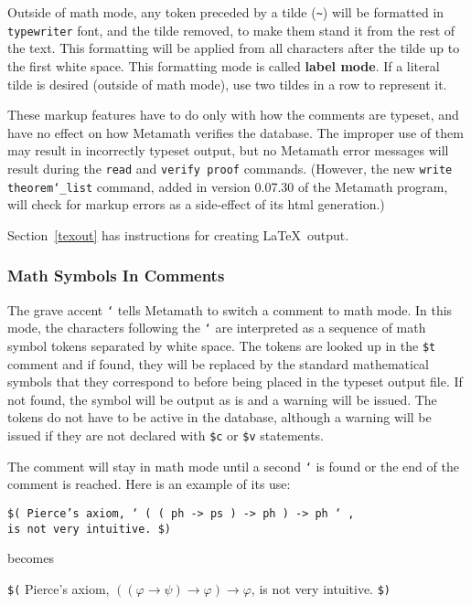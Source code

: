 Outside of math mode, any token preceded by a tilde (\verb/~/) will be formatted in \texttt{typewriter}
font, and the tilde removed, to make them stand it from the rest of the
text.  This formatting will be applied from all characters after the
tilde up to the first white space.  This formatting
mode is called {\bf label mode}.  If a literal tilde
is desired (outside of math mode), use two tildes in a row to represent
it.

These markup features have to do only with how the comments are typeset,
and have no effect on how Metamath verifies the database.  The improper
use of them may result in incorrectly typeset output, but no Metamath
error messages will result during the \texttt{read} and \texttt{verify
proof} commands.  (However, the new \texttt{write
theorem\texttt{\char`\_}list} command, added in version 0.07.30 of the
Metamath program, will check for markup errors as a side-effect of its
{\sc html} generation.)

Section~\ref{texout} has instructions for creating \LaTeX\ output.

\subsubsection{Math Symbols In Comments}

The grave accent \texttt{`} tells
Metamath to switch a comment to math mode.  In this
mode, the characters following the \texttt{`} are interpreted as a
sequence of math symbol tokens separated by white space.  The tokens are looked up in the \texttt{\$t}
comment and if
found, they will be replaced by the standard mathematical symbols that
they correspond to before being placed in the typeset output file.  If
not found, the symbol will be output as is and a warning will be issued.
The tokens do not have to be active in the database, although a warning
will be issued if they are not declared with \texttt{\$c} or
\texttt{\$v} statements.

The comment will stay in math mode until a second \texttt{`} is found or the end
of the comment is reached.  Here is an example of its use:
\begin{center}
\texttt{\$( Pierce's axiom, ` ( ( ph -> ps ) -> ph ) -> ph ` ,\\
         is not very intuitive. \$)}
\end{center}
becomes
\begin{center}
   \texttt{\$(} Pierce's axiom, $((\varphi \rightarrow \psi)\rightarrow
\varphi)\rightarrow \varphi$, is not very intuitive. \texttt{\$)}
\end{center}

